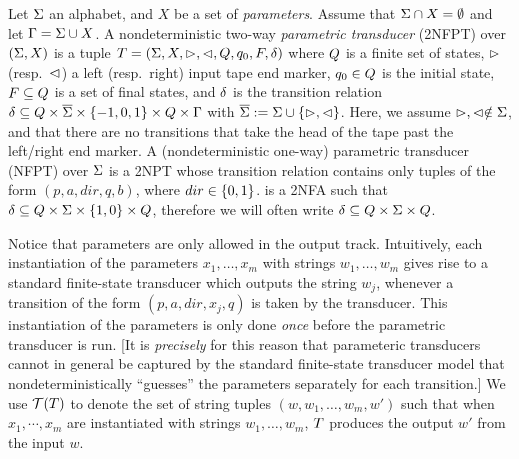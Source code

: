\begin{definition}
    Let $\Sigma$ an alphabet, and $X$ be a set of \emph{parameters}. 
    Assume that $\Sigma \cap X = \emptyset$ and let $\Gamma = 
    \Sigma \cup X$.
    A nondeterministic two-way \emph{parametric transducer} (2NFPT) over 
    $(\Sigma,X)$ is a tuple $T =
(\Sigma, X, \vartriangleright, \vartriangleleft, Q, q_0, F, \delta)$ where 
    $Q$ is a finite set of 
    states, $\vartriangleright$ (resp.~$\vartriangleleft$) a left (resp.~right) input tape end 
    marker, $q_0\in Q$ is
the initial state, $F\subseteq Q$ is a set of final states, and 
    $\delta$ is the
transition relation  $\delta\subseteq Q \times 
    \overline{\Sigma}\times \{-1, 0, 1\}\times 
    Q \times \Gamma$ with
    $\overline{\Sigma} := \Sigma \cup \{\vartriangleright,\vartriangleleft\}$.
    Here, we assume $\vartriangleright, \vartriangleleft \notin \Sigma$, and that
    there are no transitions that take the head of the tape past the left/right
    end marker. 
    A (nondeterministic one-way) parametric transducer (NFPT) over
    $\Sigma$
    is a 2NPT whose transition relation contains only tuples of the form
    $(p,a,dir,q,b)$, where $dir \in \{0,1\}$.
is a 2NFA such that $\delta\subseteq Q \times \Sigma\times
    \{1,0\} \times Q $, therefore we
will often write $\delta\subseteq Q \times \Sigma \times 
    Q$. 
\end{definition}

Notice that parameters are only allowed in the output track.
Intuitively, each instantiation of the parameters $x_1,\ldots,x_m$ with strings 
$w_1,\ldots, w_m$ gives rise to a standard finite-state transducer which outputs
the string $w_j$, whenever a transition of the form $(p, a, dir, x_j, q)$ is
taken by the transducer. This instantiation of the parameters is only done 
\emph{once} before the parametric transducer is run. [It is \emph{precisely}
for this reason that parameteric transducers cannot in general be captured by 
the standard finite-state transducer model that nondeterministically ``guesses''
the parameters separately for each transition.]  We use $\mathcal{T}(T)$ to denote the set of string tuples $(w, w_1, \ldots, w_m, w')$ such that when $x_1,\cdots, x_m$ are instantiated with strings $w_1,\ldots, w_m$, $T$ produces the output $w'$ from the input $w$. 

